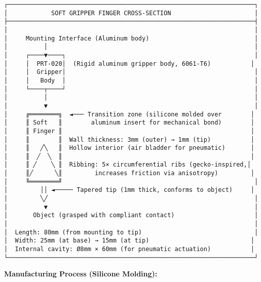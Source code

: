 \documentclass[
]{article}
\begin{document}
\begin{verbatim}
┌────────────────────────────────────────────────────────────────────┐
│            SOFT GRIPPER FINGER CROSS-SECTION                       │
├────────────────────────────────────────────────────────────────────┤
│                                                                    │
│     Mounting Interface (Aluminum body)                             │
│          │                                                         │
│     ┌────▼────┐                                                    │
│     │  PRT-020│  (Rigid aluminum gripper body, 6061-T6)           │
│     │  Gripper│                                                    │
│     │   Body  │                                                    │
│     └────┬────┘                                                    │
│          │                                                         │
│          ▼                                                         │
│     ╔════════╗  ◄─── Transition zone (silicone molded over        │
│     ║ Soft   ║        aluminum insert for mechanical bond)        │
│     ║ Finger ║                                                    │
│     ║        ║  Wall thickness: 3mm (outer) → 1mm (tip)           │
│     ║   ╱╲   ║  Hollow interior (air bladder for pneumatic)       │
│     ║  ╱  ╲  ║                                                    │
│     ║ ╱    ╲ ║  Ribbing: 5× circumferential ribs (gecko-inspired,│
│     ║╱      ╲║         increases friction via anisotropy)         │
│     ╚════════╝                                                     │
│         ││ ◄───── Tapered tip (1mm thick, conforms to object)     │
│         ╲╱                                                         │
│          ▼                                                         │
│       Object (grasped with compliant contact)                      │
│                                                                    │
│  Length: 80mm (from mounting to tip)                               │
│  Width: 25mm (at base) → 15mm (at tip)                            │
│  Internal cavity: Ø8mm × 60mm (for pneumatic actuation)           │
└────────────────────────────────────────────────────────────────────┘
\end{verbatim}

\textbf{Manufacturing Process (Silicone Molding):}
\end{document}
